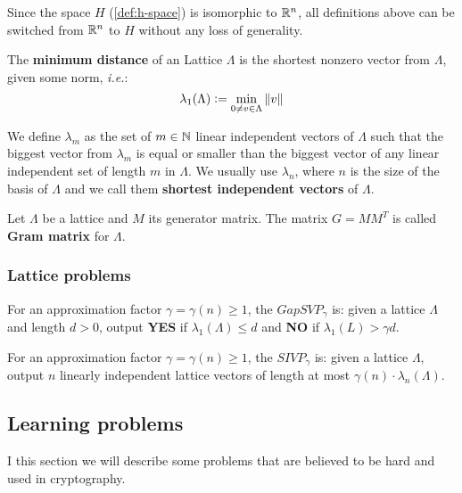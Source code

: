 \documentclass[a4paper,12pt]{article}
\begin{document}
Since the space \(H\) (\ref{def:h-space}) is isomorphic to \(\mathbb{R}^n\), all definitions above can be switched from \(\mathbb{R}^n\) to \(H\) without any loss of generality.

\begin{definition}
  The \textbf{minimum distance} of an Lattice $\Lambda$ is the shortest nonzero vector
  from $\Lambda$, given some norm, \textit{i.e.}:
  $$
  \lambda_1(\Lambda) \vcentcolon = \min_{0 \ne v \in \Lambda}{\|v\|}
  $$

  We define $\lambda_m$ as the set of $m \in \mathbb{N}$  linear independent vectors of $\Lambda$
  such that the biggest vector from $\lambda_m$ is equal or smaller than the biggest
  vector of any linear independent set of length $m$ in $\Lambda$. We usually use
  $\lambda_n$, where $n$ is the size of the basis of $\Lambda$ and we call them
  \textbf{shortest independent vectors} of $\Lambda$.
\end{definition}

\begin{definition}\label{def:gram-matrix}
  Let $\Lambda$ be a lattice and $M$ its generator matrix. The matrix $G = MM^T$ is called \textbf{Gram matrix} for $\Lambda$.
\end{definition}
\subsubsection{Lattice problems}
\label{sec:org3a326ab}
\begin{definition}
  \label{def:gapsvp}
For an approximation factor $\gamma  = \gamma(n) \geq 1$, the $GapSVP_\gamma $ is: given a lattice
$\Lambda$ and length $d > 0$, output \textbf{YES} if $\lambda_1(\Lambda) \leq d$ and \textbf{NO} if
$\lambda_1(L) > \gamma d$.  
\end{definition}

\begin{definition}
  \label{def:sivp}
  For an approximation factor $\gamma = \gamma(n) \geq 1$, the $SIVP_\gamma$ is: given a lattice $\Lambda$, output $n$ linearly independent lattice vectors of length at most $\gamma(n) \cdot \lambda_n(\Lambda)$.
\end{definition}

\subsection{Learning problems}
\label{sec:org40422cd}
I this section we will describe some problems that are believed to be hard and used in cryptography. 
\end{document}
